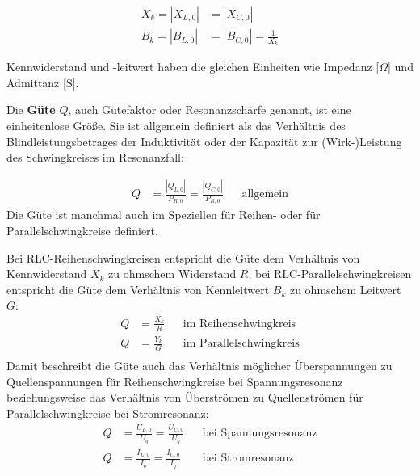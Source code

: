\begin{frame}
{    \begin{align}
        X_k = |X_{L,0}| &= |X_{C,0}|\label{eq:kennwiderstand}\\
        B_k = |B_{L,0}| &= |B_{C,0}| = \frac{1}{X_k}\label{eq:kennleitwert}
    \end{align}

    Kennwiderstand und -leitwert haben die gleichen Einheiten wie Impedanz [$\Omega$] und Admittanz [$\mathrm{S}$]. 

    Die \textbf{Güte} $Q$, auch Gütefaktor oder Resonanzschärfe genannt, ist eine einheitenlose Größe.
    Sie ist allgemein definiert als das Verhältnis des Blindleistungsbetrages der Induktivität oder der Kapazität 
    zur (Wirk-)Leistung des Schwingkreises im Resonanzfall:

    \begin{align}\label{eq:q:leistung}
        Q &= \frac{|Q_{L,0}|}{P_{R,0}} = \frac{|Q_{C,0}|}{P_{R,0}}&&\text{allgemein}
    \end{align}
        Die Güte ist manchmal auch im Speziellen für Reihen- oder für Parallelschwingkreise definiert.

        Bei RLC-Reihenschwingkreisen entspricht die Güte dem Verhältnis von Kennwiderstand $X_k$ zu ohmschem Widerstand $R$,
        bei RLC-Parallelschwingkreisen entspricht die Güte dem Verhältnis von Kennleitwert $B_k$ zu ohmschem Leitwert $G$:
    \begin{align}
        Q &= \frac{X_k}{R}&&\text{im Reihenschwingkreis}\label{eq:q:kennwiderstand}\\
        Q &= \frac{Y_k}{G}&&\text{im Parallelschwingkreis}\label{eq:q:kennleitwert}\\
    \end{align} 
        Damit beschreibt die Güte auch das Verhältnis möglicher 
        Überspannungen zu Quellenspannungen für Reihenschwingkreise bei Spannungsresonanz beziehungsweise das Verhältnis von 
        Überströmen zu Quellenströmen für Parallelschwingkreise bei Stromresonanz:
    \begin{align}
        Q &= \frac{U_{L,0}}{U_{q}} = \frac{U_{C,0}}{U_{q}} && \text{bei Spannungsresonanz}\label{eq:q:spannung}\\
        Q &= \frac{I_{L,0}}{I_{q}} = \frac{I_{C,0}}{I_{q}} && \text{bei Stromresonanz}\label{eq:q:strom}
    \end{align}
    
}
\end{frame}
